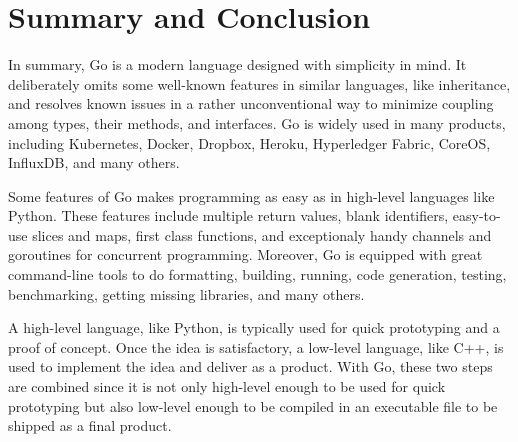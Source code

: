 \documentclass[11pt]{article}
\begin{document}
\section{Summary and Conclusion}
\label{sec:orgheadline22}
In summary, Go is a modern language designed with simplicity in mind. It deliberately omits some well-known features in similar languages, like inheritance, and resolves known issues in a rather unconventional way to minimize coupling among types, their methods, and interfaces. Go is widely used in many products, including Kubernetes, Docker, Dropbox, Heroku, Hyperledger Fabric, CoreOS, InfluxDB, and many others.

Some features of Go makes programming as easy as in high-level languages like Python. These features include multiple return values, blank identifiers, easy-to-use slices and maps, first class functions, and exceptionaly handy channels and goroutines for concurrent programming. Moreover, Go is equipped with great command-line tools to do formatting, building, running, code generation, testing, benchmarking, getting missing libraries, and many others.

A high-level language, like Python, is typically used for quick prototyping and a proof of concept. Once the idea is satisfactory, a low-level language, like C++, is used to implement the idea and deliver as a product. With Go, these two steps are combined since it is not only high-level enough to be used for quick prototyping but also low-level enough to be compiled in an executable file to be shipped as a final product.
\end{document}
